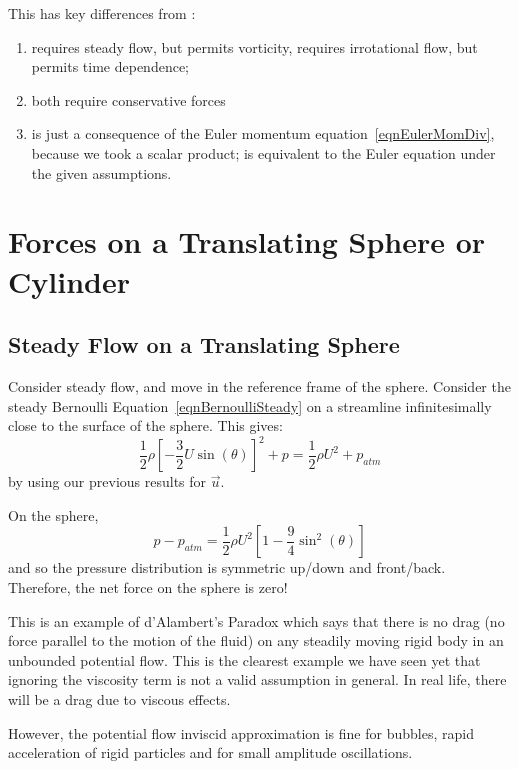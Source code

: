 \documentclass[../Main.tex]{subfiles}
\begin{document}
This has key differences from :
\begin{enumerate}
    \item {} requires steady flow, but permits vorticity,  requires irrotational flow, but permits time dependence;
    \item both require conservative forces
    \item {} is just a consequence of the Euler momentum equation~\ref{eqnEulerMomDiv}, because we took a scalar product;  is equivalent to the Euler equation under the given assumptions.
\end{enumerate}
\section{Forces on a Translating Sphere or Cylinder}
\subsection{Steady Flow on a Translating Sphere}\label{secTranslatingSphere}
Consider steady flow, and move in the reference frame of the sphere. Consider the steady Bernoulli Equation~\ref{eqnBernoulliSteady} on a streamline infinitesimally close to the surface of the sphere. This gives:
\begin{equation*}
    \frac12 \rho \left[-\frac32 U \sin(\theta)\right]^2 + p = \frac12 \rho U^2 + p_{atm}
\end{equation*}
by using our previous results for $\vec{u}$.

On the sphere,
\begin{equation*}
    p - p_{atm} = \frac12 \rho U^2\left[1 - \frac94 \sin^2(\theta)\right]
\end{equation*}
and so the pressure distribution is symmetric up/down and front/back. Therefore, the net force on the sphere is zero!

This is an example of d'Alambert's Paradox which says that there is no drag (no force parallel to the motion of the fluid) on any steadily moving rigid body in an unbounded potential flow. This is the clearest example we have seen yet that ignoring the viscosity term is not a valid assumption in general. In real life, there will be a drag due to viscous effects.

However, the potential flow inviscid approximation is fine for bubbles, rapid acceleration of rigid particles and for small amplitude oscillations.
\end{document}
